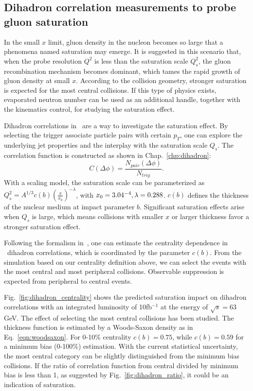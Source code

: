 \subsection{Dihadron correlation measurements to probe gluon saturation}

In the small $x$ limit, gluon density in the nucleon becomes so large that a
phenomena named saturation may emerge. It is suggested in this scenario that, when the probe
resolution $Q^{2}$ is less than the saturation scale $Q^{2}_{s}$, the gluon
recombination mechanism becomes dominant, which tames the rapid growth of
gluon density at small $x$. According to the collision
geometry, stronger saturation is expected for the most central collisions. If
this type of physics exists, evaporated neutron number can be used as an
additional handle, together with the kinematics control, for studying the saturation effect.

Dihadron correlations in \eA\ are a way to investigate the saturation effect. By
selecting the trigger associate particle pairs with certain $p_{T}$, one can
explore the underlying jet properties and the interplay with the saturation
scale $Q_{s}$. The correlation function is constructed as shown in Chap.~\ref{chp:dihadron}:
\begin{equation}
C(\Delta\phi)=\frac{N_{pair}(\Delta\phi)}{N_{trig}}.
\end{equation}
With a scaling model, the saturation scale can be parameterized as
$Q_{s}^{2}=A^{1/3} c(b)(\frac{x}{x_{0}})^{-\lambda}$, with $x_{0}=3.04\time
10^{-4}, \lambda = 0.288$. $c(b)$ defines the thickness of the nuclear medium at
impact parameter $b$. Significant saturation effects arise when $Q_{s}$ is
large, which means collisions with smaller $x$ or larger thickness favor a
stronger saturation effect.

Following the formalism in~\cite{Zheng:2014vka}, one can estimate the centrality
dependence in \eA\ dihadron correlations, which is coordinated by the parameter $c(b)$.
From the simulation based on our centrality definition above, we can select the
events with the most central and most peripheral collisions. Observable suppression
is expected from peripheral to central events.

Fig.~\ref{fig:dihadron_centrality} shows the predicted saturation impact on dihadron correlations with an integrated luminosity of 10fb$^{-1}$ at the energy of $\sqrt{s}=63$ GeV.
The effect of selecting the most central collisions has been studied. The thickness function is estimated by
a Woods-Saxon density as in Eq.~\ref{eqn:woodsaxon}. For 0-10\% centrality $c(b)=0.75$, while $c(b)=0.59$
for a minimum bias (0-100\%) estimation. With the current statistical uncertainty, the most central category can be slightly distinguished from the minimum bias collisions. If the ratio of correlation function from central divided by minimum bias is less than 1, as suggested by Fig.~\ref{fig:dihadron_ratio}, it could be an indication of saturation.


